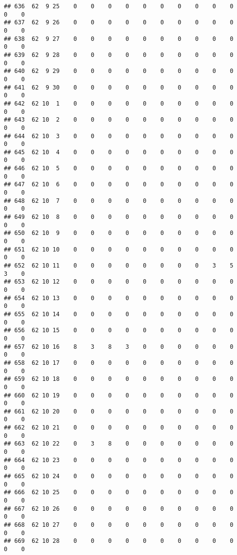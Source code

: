\documentclass[]{article}
\begin{document}
\begin{verbatim}
## 636  62  9 25    0    0    0    0    0    0    0    0    0    0    0    0
## 637  62  9 26    0    0    0    0    0    0    0    0    0    0    0    0
## 638  62  9 27    0    0    0    0    0    0    0    0    0    0    0    0
## 639  62  9 28    0    0    0    0    0    0    0    0    0    0    0    0
## 640  62  9 29    0    0    0    0    0    0    0    0    0    0    0    0
## 641  62  9 30    0    0    0    0    0    0    0    0    0    0    0    0
## 642  62 10  1    0    0    0    0    0    0    0    0    0    0    0    0
## 643  62 10  2    0    0    0    0    0    0    0    0    0    0    0    0
## 644  62 10  3    0    0    0    0    0    0    0    0    0    0    0    0
## 645  62 10  4    0    0    0    0    0    0    0    0    0    0    0    0
## 646  62 10  5    0    0    0    0    0    0    0    0    0    0    0    0
## 647  62 10  6    0    0    0    0    0    0    0    0    0    0    0    0
## 648  62 10  7    0    0    0    0    0    0    0    0    0    0    0    0
## 649  62 10  8    0    0    0    0    0    0    0    0    0    0    0    0
## 650  62 10  9    0    0    0    0    0    0    0    0    0    0    0    0
## 651  62 10 10    0    0    0    0    0    0    0    0    0    0    0    0
## 652  62 10 11    0    0    0    0    0    0    0    0    3    5    3    0
## 653  62 10 12    0    0    0    0    0    0    0    0    0    0    0    0
## 654  62 10 13    0    0    0    0    0    0    0    0    0    0    0    0
## 655  62 10 14    0    0    0    0    0    0    0    0    0    0    0    0
## 656  62 10 15    0    0    0    0    0    0    0    0    0    0    0    0
## 657  62 10 16    8    3    8    3    0    0    0    0    0    0    0    0
## 658  62 10 17    0    0    0    0    0    0    0    0    0    0    0    0
## 659  62 10 18    0    0    0    0    0    0    0    0    0    0    0    0
## 660  62 10 19    0    0    0    0    0    0    0    0    0    0    0    0
## 661  62 10 20    0    0    0    0    0    0    0    0    0    0    0    0
## 662  62 10 21    0    0    0    0    0    0    0    0    0    0    0    0
## 663  62 10 22    0    3    8    0    0    0    0    0    0    0    0    0
## 664  62 10 23    0    0    0    0    0    0    0    0    0    0    0    0
## 665  62 10 24    0    0    0    0    0    0    0    0    0    0    0    0
## 666  62 10 25    0    0    0    0    0    0    0    0    0    0    0    0
## 667  62 10 26    0    0    0    0    0    0    0    0    0    0    0    0
## 668  62 10 27    0    0    0    0    0    0    0    0    0    0    0    0
## 669  62 10 28    0    0    0    0    0    0    0    0    0    0    0    0

\end{verbatim}
\end{document}
